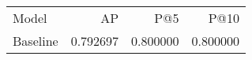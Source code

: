 \begin{tabular}{lrrr}
Model & AP & P@5 & P@10 \\
Baseline & 0.792697 & 0.800000 & 0.800000 \\
\end{tabular}
